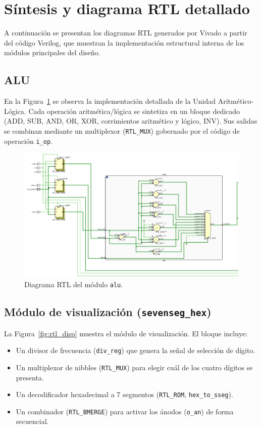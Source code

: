 \section{Síntesis y diagrama RTL detallado}

A continuación se presentan los diagramas RTL generados por Vivado a partir del código Verilog, que muestran la implementación estructural interna de los módulos principales del diseño.

\subsection{ALU}
En la Figura~\ref{fig:rtl_alu} se observa la implementación detallada de la Unidad Aritmético-Lógica. Cada operación aritmética/lógica se sintetiza en un bloque dedicado (ADD, SUB, AND, OR, XOR, corrimientos aritmético y lógico, INV). Sus salidas se combinan mediante un multiplexor (\texttt{RTL\_MUX}) gobernado por el código de operación \texttt{i\_op}.

\begin{figure}[H]
    \centering
    \includegraphics[width=\textwidth]{img/alu.png} %
    \caption{Diagrama RTL del módulo \texttt{alu}.}
    \label{fig:rtl_alu}
\end{figure}

\subsection{Módulo de visualización (\texttt{sevenseg\_hex})}
La Figura~\ref{fig:rtl_disp} muestra el módulo de visualización. El bloque incluye:
\begin{itemize}
    \item Un divisor de frecuencia (\texttt{div\_reg}) que genera la señal de selección de dígito.
    \item Un multiplexor de nibbles (\texttt{RTL\_MUX}) para elegir cuál de los cuatro dígitos se presenta.
    \item Un decodificador hexadecimal a 7 segmentos (\texttt{RTL\_ROM}, \texttt{hex\_to\_sseg}).
    \item Un combinador (\texttt{RTL\_BMERGE}) para activar los ánodos (\texttt{o\_an}) de forma secuencial.
\end{itemize}

